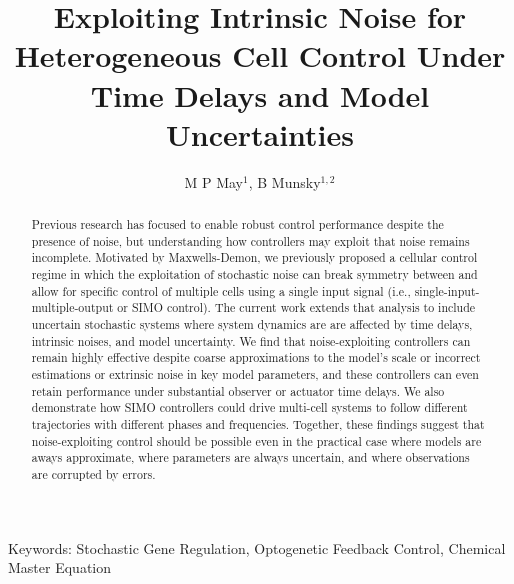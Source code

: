 \documentclass[12pt]{iopart}
\begin{document}
\def\brian[#1]{{\color{red} #1 }}
\def\michael[#1]{{\color{green} #1 }}

\title[Heterogeneous Control of Cell Differentiation Dynamics]{Exploiting Intrinsic Noise for Heterogeneous Cell Control Under Time Delays and Model Uncertainties}
\maketitle

\author{M P May$^1$, B Munsky$^{1,2}$}

\address{$^1$ School of Bioengineering, Colorado State University, Fort Collins, CO, USA}
\address{$^2$ Department of Chemical and Biological Engineering, Colorado State University, Fort Collins, CO, USA}

\begin{abstract}
Previous research has focused to enable robust control performance despite the presence of noise, but understanding how controllers may exploit that noise remains incomplete. 
Motivated by Maxwells-Demon, we previously proposed a cellular control regime in which the exploitation of stochastic noise can break symmetry between and allow for specific control of multiple cells using a single input signal (i.e., single-input-multiple-output or SIMO control).
The current work extends that analysis to include uncertain stochastic systems where system dynamics are are affected by time delays, intrinsic noises, and model uncertainty. 
We find that noise-exploiting controllers can remain highly effective despite coarse approximations to the model's scale or incorrect estimations or extrinsic noise in key model parameters, and these controllers can even retain performance under substantial observer or actuator time delays.  
We also demonstrate how SIMO controllers could drive multi-cell systems to follow different trajectories with different phases and frequencies.
Together, these findings suggest that noise-exploiting control should be possible even in the practical case where models are aways approximate, where parameters are always uncertain, and where observations are corrupted by errors.

\end{abstract}
Keywords: Stochastic Gene Regulation, Optogenetic Feedback Control, Chemical Master Equation

\maketitle
\end{document}
